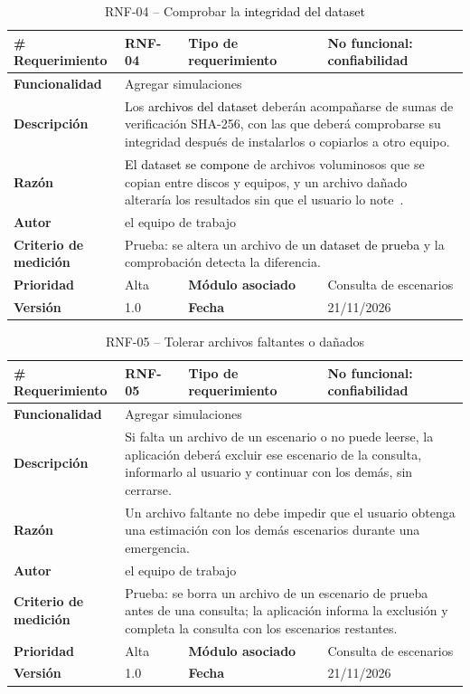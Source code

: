 \begin{longtable}{|p{\rqA}|p{\rqB}|p{\rqC}|p{\rqD}|}
  \caption{RNF-04 -- Comprobar la \textcolor{black}{integridad del dataset}}\label{tab:rnf-04}\tabularnewline
  \hline
  \textbf{\# Requerimiento} & RNF-04 & \raggedright\textbf{Tipo de requerimiento} & No funcional: confiabilidad\tabularnewline\hline
  \raggedright\textbf{Funcionalidad} & \multicolumn{3}{p{\rqBCD}|}{Agregar simulaciones}\tabularnewline\hline
  \endfirsthead
  \textbf{Descripción} & \multicolumn{3}{p{\rqBCD}|}{Los \textcolor{black}{archivos del dataset} deberán acompañarse de sumas de verificación SHA-256, con las que deberá comprobarse su integridad después de instalarlos o copiarlos a otro equipo.}\tabularnewline\hline
  \textbf{Razón} & \multicolumn{3}{p{\rqBCD}|}{\textcolor{black}{El dataset se compone} de archivos voluminosos que se copian entre discos y equipos, y un archivo dañado alteraría los resultados sin que el usuario lo note~\cite{pmp2026}.}\tabularnewline\hline
  \textbf{Autor} & \multicolumn{3}{p{\rqBCD}|}{el equipo de trabajo}\tabularnewline\hline
  \raggedright\textbf{Criterio de medición} & \multicolumn{3}{p{\rqBCD}|}{Prueba: se altera un archivo de \textcolor{black}{un dataset de prueba} y la comprobación detecta la diferencia.}\tabularnewline\hline
  \textbf{Prioridad} & Alta & \raggedright\textbf{Módulo asociado} & Consulta de escenarios\tabularnewline\hline
  \textbf{Versión} & 1.0 & \textbf{Fecha} & 21/11/2026\tabularnewline\hline
\end{longtable}

\begin{longtable}{|p{\rqA}|p{\rqB}|p{\rqC}|p{\rqD}|}
  \caption{RNF-05 -- Tolerar archivos faltantes o dañados}\label{tab:rnf-05}\tabularnewline
  \hline
  \textbf{\# Requerimiento} & RNF-05 & \raggedright\textbf{Tipo de requerimiento} & No funcional: confiabilidad\tabularnewline\hline
  \raggedright\textbf{Funcionalidad} & \multicolumn{3}{p{\rqBCD}|}{Agregar simulaciones}\tabularnewline\hline
  \endfirsthead
  \textbf{Descripción} & \multicolumn{3}{p{\rqBCD}|}{Si falta un archivo de un escenario o no puede leerse, la aplicación deberá excluir ese escenario de la consulta, informarlo al usuario y continuar con los demás, sin cerrarse.}\tabularnewline\hline
  \textbf{Razón} & \multicolumn{3}{p{\rqBCD}|}{Un archivo faltante no debe impedir que el usuario obtenga una estimación con los demás escenarios durante una emergencia.}\tabularnewline\hline
  \textbf{Autor} & \multicolumn{3}{p{\rqBCD}|}{el equipo de trabajo}\tabularnewline\hline
  \raggedright\textbf{Criterio de medición} & \multicolumn{3}{p{\rqBCD}|}{Prueba: se borra un archivo de un escenario de prueba antes de una consulta; la aplicación informa la exclusión y completa la consulta con los escenarios restantes.}\tabularnewline\hline
  \textbf{Prioridad} & Alta & \raggedright\textbf{Módulo asociado} & Consulta de escenarios\tabularnewline\hline
  \textbf{Versión} & 1.0 & \textbf{Fecha} & 21/11/2026\tabularnewline\hline
\end{longtable}
